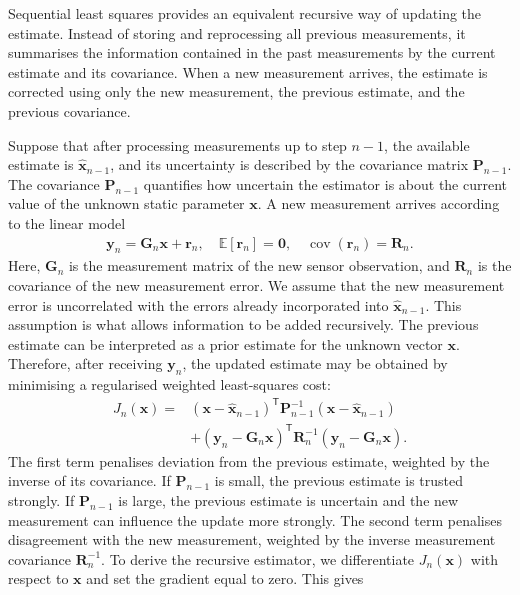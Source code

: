 \documentclass{ieeeaccess}
\begin{document}
Sequential least squares provides an equivalent recursive way of updating the estimate. Instead of storing and reprocessing all previous measurements, it summarises the information contained in the past measurements by the current estimate and its covariance. When a new measurement arrives, the estimate is corrected using only the new measurement, the previous estimate, and the previous covariance.

Suppose that after processing measurements up to step $n-1$, the available estimate is $\widehat{\mathbf{x}}_{n-1}$, and its uncertainty is described by the covariance matrix $\mathbf{P}_{n-1}$. The covariance $\mathbf{P}_{n-1}$ quantifies how uncertain the estimator is about the current value of the unknown static parameter $\mathbf{x}$. A new measurement arrives according to the linear model
\begin{align*}
\mathbf{y}_n
=
\mathbf{G}_n\mathbf{x}
+
\mathbf{r}_n,
\quad
\mathbb{E}[\mathbf{r}_n]=\mathbf{0},
\quad
\operatorname{cov}(\mathbf{r}_n)=\mathbf{R}_n.
\end{align*}
Here, $\mathbf{G}_n$ is the measurement matrix of the new sensor observation, and $\mathbf{R}_n$ is the covariance of the new measurement error. We assume that the new measurement error is uncorrelated with the errors already incorporated into $\widehat{\mathbf{x}}_{n-1}$. This assumption is what allows information to be added recursively. The previous estimate can be interpreted as a prior estimate for the unknown vector $\mathbf{x}$. Therefore, after receiving $\mathbf{y}_n$, the updated estimate may be obtained by minimising a regularised weighted least-squares cost:
\begin{align}
J_n(\mathbf{x})
=&
\left(
\mathbf{x}
-
\widehat{\mathbf{x}}_{n-1}
\right)^{\mathsf T}
\mathbf{P}_{n-1}^{-1}
\left(
\mathbf{x}
-
\widehat{\mathbf{x}}_{n-1}
\right) \\
&+
\left(
\mathbf{y}_n
-
\mathbf{G}_n\mathbf{x}
\right)^{\mathsf T}
\mathbf{R}_n^{-1}
\left(
\mathbf{y}_n
-
\mathbf{G}_n\mathbf{x}
\right). \nonumber
\end{align}
The first term penalises deviation from the previous estimate, weighted by the inverse of its covariance. If $\mathbf{P}_{n-1}$ is small, the previous estimate is trusted strongly. If $\mathbf{P}_{n-1}$ is large, the previous estimate is uncertain and the new measurement can influence the update more strongly. The second term penalises disagreement with the new measurement, weighted by the inverse measurement covariance $\mathbf{R}_n^{-1}$. To derive the recursive estimator, we differentiate $J_n(\mathbf{x})$ with respect to $\mathbf{x}$ and set the gradient equal to zero. This gives
\end{document}
